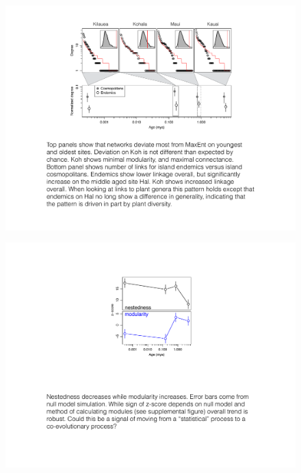 \documentclass[12pt]{article}
\begin{document}
\begin{linenumbers}
\begin{figure}[!hp]
  \centering
  \includegraphics[scale=0.8]{../fig_degree.pdf} 
  \caption{}
  \label{fig:degree}
\end{figure}

\begin{figure}[!hp]
  \centering
  \includegraphics[scale=1]{../fig_netMets.pdf} 
  \caption{}
  \label{fig:netMet}
\end{figure}

\end{linenumbers}
\end{document}
